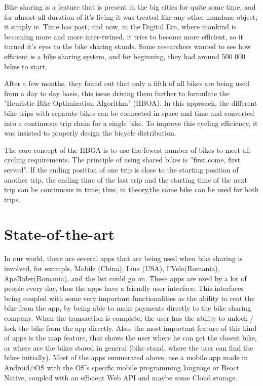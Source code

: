 \documentclass[12pt]{article}
\begin{document}
Bike sharing is a feature that is present in the big cities for quite some time, and for almost all duration of it's living it was treated like any other mundane object; it simply is. Time has past, and now, in the Digital Era, where mankind is becoming more and more inter-twined, it tries to become more efficient, so it turned it's eyes to the bike sharing stands. Some researchers wanted to see how efficient is a bike sharing system, and for beginning, they had around 500 000 bikes to start. 

After a few months, they found out that only a fifth of all bikes are being used from a day to day basis, this issue driving them further to formulate the "Heuristic Bike Optimization Algorithm" (HBOA). In  this  approach,  the  different  bike  trips  with  separate  bikes can be connected in space and time and converted into a continuous trip chain for a single bike. To improve this cycling efficiency, it was insisted to properly design the bicycle distribution. 

The core concept of the HBOA is to use the fewest number of bikes to meet all cycling requirements. The principle of using shared bikes is ”first come, first served”. If the ending position of one trip is close to the starting position of another trip,  the ending time of the last trip and the starting time of the next trip can be continuous in time; thus, in theory,the same bike can be used for both trips.

\section{State-of-the-art}

In  our  world,  there  are  several  apps  that  are  being  used  when  bike  sharing is  involved,  for  example,  Mobile  (China),  Line  (USA),  I’Velo(Romania),  ApeRider(Romania),  and  the  list  could  go  on.   These  apps  are  used  by  a  lot  of people every day,  thus the apps have a friendly user interface.  This interfaces being coupled with some very important functionalities as the ability to rent the  bike  from  the  app,  by  being  able  to  make  payments  directly  to  the  bike sharing company.  When the transaction is complete, the user has the ability to unlock / lock the bike from the app directly.  Also, the most important feature of this kind of apps is the map feature, that shows the user where he can get the closest bike, or where are the bikes stored in general (bike stand, where the user  can  find  the  bikes  initially).   Most  of  the  apps  enumerated  above,  use  a mobile app made in Android/iOS with the OS’s specific mobile programming language or React Native, coupled with an efficient Web API and maybe some Cloud storage.
\end{document}
